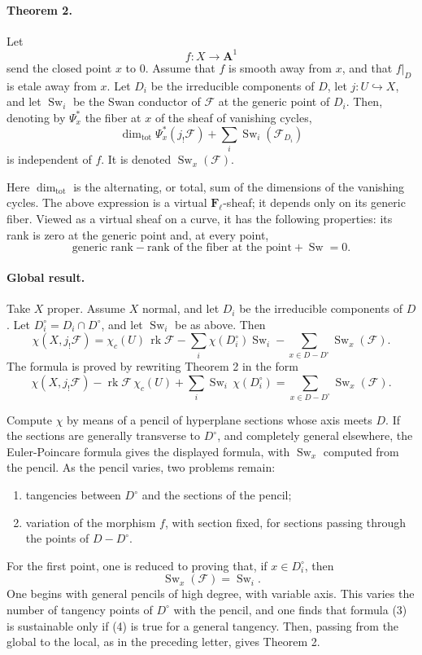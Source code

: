 \documentclass[11pt]{article}
\newcommand{\F}{\mathcal F}
\newcommand{\Fell}{\mathbf F_\ell}
\newcommand{\A}{\mathbf A}
\DeclareMathOperator{\Sw}{Sw}
\DeclareMathOperator{\rk}{rk}
\DeclareMathOperator{\Tot}{tot}
\begin{document}
\paragraph{Theorem 2.}
Let
\[
  f:X\longrightarrow \A^1
\]
send the closed point \(x\) to \(0\). Assume that \(f\) is smooth away from \(x\), and that \(f|_D\) is etale away from \(x\). Let \(D_i\) be the irreducible components of \(D\), let \(j:U\hookrightarrow X\), and let \(\Sw_i\) be the Swan conductor of \(\F\) at the generic point of \(D_i\). Then, denoting by \(\Psi_x^*\) the fiber at \(x\) of the sheaf of vanishing cycles,
\[
  \dim_{\Tot}\Psi_x^*(j_!\F)
  +\sum_i \Sw_i(\F_{D_i})
\tag{2}
\]
is independent of \(f\). It is denoted \(\Sw_x(\F)\).

Here \(\dim_{\Tot}\) is the alternating, or total, sum of the dimensions of the vanishing cycles. The above expression is a virtual \(\Fell\)-sheaf; it depends only on its generic fiber. Viewed as a virtual sheaf on a curve, it has the following properties: its rank is zero at the generic point and, at every point,
\[
  \text{generic rank}-\text{rank of the fiber at the point}+\Sw=0.
\]

\paragraph{Global result.}
Take \(X\) proper. Assume \(X\) normal, and let \(D_i\) be the irreducible components of \(D\). Let \(D_i^\circ=D_i\cap D^\circ\), and let \(\Sw_i\) be as above. Then
\[
  \chi(X,j_!\F)
  =\chi_c(U)\,\rk\F
   -\sum_i \chi(D_i^\circ)\Sw_i
   -\sum_{x\in D-D^\circ}\Sw_x(\F).
\tag{3}
\]
The formula is proved by rewriting Theorem 2 in the form
\[
  \chi(X,j_!\F)-\rk\F\,\chi_c(U)
  +\sum_i \Sw_i\,\chi(D_i^\circ)
  =\sum_{x\in D-D^\circ}\Sw_x(\F).
\]

Compute \(\chi\) by means of a pencil of hyperplane sections whose axis meets \(D\). If the sections are generally transverse to \(D^\circ\), and completely general elsewhere, the Euler-Poincare formula gives the displayed formula, with \(\Sw_x\) computed from the pencil. As the pencil varies, two problems remain:
\begin{enumerate}[label=\alph*)]
\item tangencies between \(D^\circ\) and the sections of the pencil;
\item variation of the morphism \(f\), with section fixed, for sections passing through the points of \(D-D^\circ\).
\end{enumerate}
For the first point, one is reduced to proving that, if \(x\in D_i^\circ\), then
\[
  \Sw_x(\F)=\Sw_i.
\tag{4}
\]
One begins with general pencils of high degree, with variable axis. This varies the number of tangency points of \(D^\circ\) with the pencil, and one finds that formula (3) is sustainable only if (4) is true for a general tangency. Then, passing from the global to the local, as in the preceding letter, gives Theorem 2.
\end{document}
